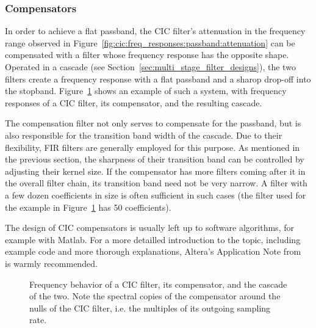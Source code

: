 \subsubsection{Compensators} %
\label{subsubsec:cic:compensators}

In     order      to     achieve     a     flat      passband,     the     CIC
filter's    attenuation     in    the    frequency    range     observed    in
Figure~\ref{fig:cic:freq_responses:passband:attenuation}  can  be  compensated
with a filter  whose frequency response has the opposite  shape. Operated in a
cascade  (see Section~\ref{sec:multi_stage_filter_designs}),  the two  filters
create a  frequency response with a  flat passband and a  sharop drop-off into
the  stopband. Figure~\ref{fig:cic:cfir} shows  an example  of such  a system,
with frequency responses  of a CIC filter, its compensator,  and the resulting
cascade.

The compensation filter not only serves to compensate for the passband, but is
also responsible  for the transition band  width of the cascade. Due  to their
flexibility, FIR filters are generally employed for this purpose. As mentioned
in  the previous  section,  the  sharpness of  their  transition  band can  be
controlled  by  adjusting  their  kernel size. If  the  compensator  has  more
filters  coming after  it in  the overall  filter chain,  its transition  band
need  not be  very narrow. A  filter  with a  few dozen  coefficients in  size
is  often  sufficient in  such  cases  (the filter  used  for  the example  in
Figure~\ref{fig:cic:cfir} has \num{50} coefficients).

The design of CIC compensators is  usually left up to software algorithms, for
example with Matlab. For a more detailled introduction to the topic, including
example  code  and  more  thorough  explanations,  Altera's  Application  Note
from~\cite{altera:an455} is warmly recommended.

\begin{figure}
    \centering
    
    \caption[CIC Compensator]{%
        Frequency behavior of  a CIC filter, its compensator,  and the cascade
        of the  two. Note the  spectral copies of  the compensator  around the
        nulls of the  CIC filter, i.e. the multiples of  its outgoing sampling
        rate.%
    }
    \label{fig:cic:cfir}
\end{figure}
%
%
